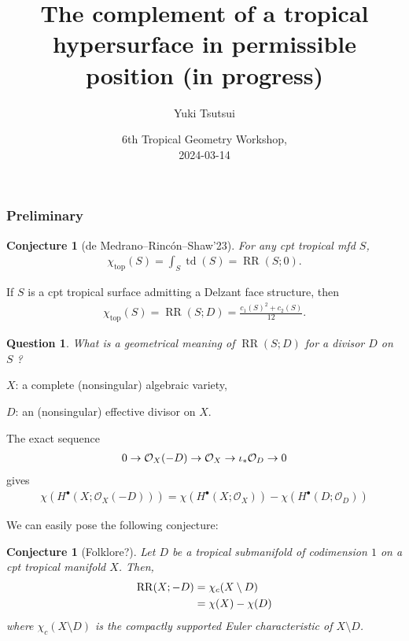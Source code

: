 \documentclass[dvipdfmx,12pt]{beamer}%
\title[{The complement of a tropical 
hypersurface}]{The complement of a tropical 
hypersurface in permissible position (in progress)}
\author[Y. Tsutsui]{Yuki Tsutsui}
\institute[UT]{Graduate School of Mathematical Sciences \and University of Tokyo}
\date{6th Tropical Geometry Workshop,\\

2024-03-14}
\newtheorem{question}[theorem]{Question}
\newtheorem{conjecture}[theorem]{Conjecture}
\theoremstyle{definition}
\newcommand{\opn}[1]{\operatorname{#1}}
\begin{document}
\setlength{\abovedisplayskip}{3pt}
\setlength{\belowdisplayskip}{3pt}

\maketitle

\begin{frame}
\frametitle{Preliminary}
\end{frame}

\begin{frame}


\begin{conjecture}[{de Medrano--Rinc\'on--Shaw'23}]
For any cpt tropical mfd $S$, 
\begin{align}
\chi_{\opn{top}}(S)=\int_{S}\opn{td}(S)=\opn{RR}(S;0).
\end{align}
\end{conjecture}

\begin{theorem}
If $S$ is a cpt tropical 
surface admitting a
Delzant face structure, then
\begin{align}
\chi_{\opn{top}}(S)=\opn{RR}(S;D)=\frac{c_1(S)^2+c_2(S)}{12}.
\end{align}

\end{theorem}

\begin{question}
What is a geometrical meaning of $\opn{RR}(S;D)$ for 
a divisor $D$ on $S$ ?
\end{question}

\end{frame}

\begin{frame}

$X$: a complete (nonsingular) algebraic variety,

$D$: an (nonsingular) effective divisor on $X$.

The exact sequence
\begin{align}
0 \to \mathcal{O}_X(-D)\to
\mathcal{O}_X
\to \iota_{*}\mathcal{O}_D \to 0 \notag
\end{align}
gives 
\begin{align}
\chi (H^\bullet(X;\mathcal{O}_X(-D)))=
\chi (H^\bullet(X;\mathcal{O}_X))-
\chi (H^\bullet(D;\mathcal{O}_D))
\end{align}

We can easily pose the following conjecture:
\begin{conjecture}[Folklore?]
Let $D$ be a tropical submanifold of codimension $1$ on
a cpt tropical manifold $X$. Then,
\begin{align}
\opn{RR}(X;-D)&=\chi_{c}(X\setminus D) \\
&=\chi(X)-\chi(D) \notag
\end{align}
where $\chi_{c}(X\setminus D)$
is the compactly supported Euler 
characteristic of $X\setminus D$. 
 
\end{conjecture}

\end{frame}
\end{document}

